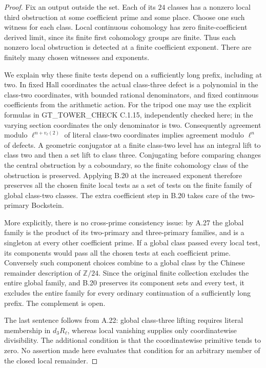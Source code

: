 \begin{proof}
Fix an output outside the set. Each of its $24$ classes has a nonzero
local third obstruction at some coefficient prime and some place.
Choose one such witness for each class. Local continuous cohomology
has zero finite-coefficient derived limit, since its finite first
cohomology groups are finite. Thus each nonzero local obstruction is
detected at a finite coefficient exponent. There are finitely many
chosen witnesses and exponents.

We explain why these finite tests depend on a sufficiently long
prefix, including at two. In fixed Hall coordinates the actual
class-three defect is a polynomial in the class-two coordinates,
with bounded rational denominators, and fixed continuous coefficients
from the arithmetic action. For the tripod one may use the explicit
formulas in GT\_TOWER\_CHECK C.1.15, independently checked here;
in the varying section coordinates the only denominator is two.
Consequently agreement modulo $\ell^{n+v_\ell(2)}$ of literal
class-two coordinates implies agreement modulo $\ell^n$ of defects.
A geometric conjugator at a finite class-two level has an integral
lift to class two and then a set lift to class three. Conjugating
before comparing changes the central obstruction by a coboundary,
so the finite cohomology class of the obstruction is preserved.
Applying B.20 at the increased exponent therefore preserves all the
chosen finite local tests as a set of tests on the finite family of
global class-two classes. The extra coefficient step in B.20 takes
care of the two-primary Bockstein.

More explicitly, there is no cross-prime consistency issue: by A.27
the global family is the product of its two-primary and three-primary
families, and is a singleton at every other coefficient prime.
If a global class passed every local test, its components would pass
all the chosen tests at each coefficient prime. Conversely such
component choices combine to a global class by the Chinese remainder
description of $\mathbb Z/24$. Since the original finite collection
excludes the entire global family, and B.20 preserves its component
sets and every test, it excludes the entire family for every ordinary
continuation of a sufficiently long prefix. The complement is open.

The last sentence follows from A.22: global class-three lifting
requires literal membership in $d_3R_\ell$, whereas local
vanishing supplies only coordinatewise divisibility. The additional
condition is that the coordinatewise primitive tends to zero.
No assertion made here evaluates that condition for an arbitrary
member of the closed local remainder.
\end{proof}

